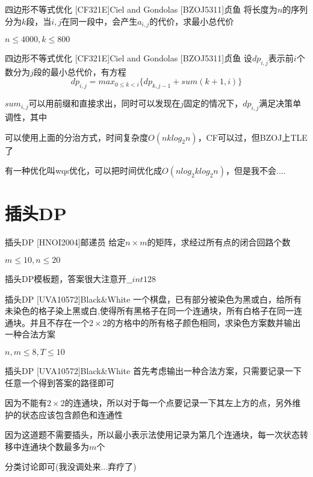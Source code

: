 \documentclass[9pt]{beamer}
\begin{document}
  \begin{frame}{四边形不等式优化 [CF321E]Ciel and Gondolas [BZOJ5311]贞鱼}
     将长度为$n$的序列分为$k$段，当$i,j$在同一段中，会产生$a_{i,j}$的代价，求最小总代价
    
     $n\leq 4000,k\leq 800$
  \end{frame}
    
  \begin{frame}{四边形不等式优化 [CF321E]Ciel and Gondolas [BZOJ5311]贞鱼}
     设$dp_{i,j}$表示前$i$个数分为$j$段的最小总代价，有方程
     $$dp_{i,j}=max_{0\leq k<i}\{dp_{k,j-1}+sum(k+1,i)\}$$
    
     $sum_{i,j}$可以用前缀和直接求出，同时可以发现在$j$固定的情况下，$dp_{i,j}$满足决策单调性，其中
    
     可以使用上面的分治方式，时间复杂度$O(nklog_2n)$，CF可以过，但BZOJ上TLE了

     有一种优化叫wqs优化，可以把时间优化成$O(nlog_2klog_2n)$，但是我不会....
  \end{frame}

  \section{插头DP}

  \begin{frame}{插头DP [HNOI2004]邮递员}
     给定$n\times m$的矩阵，求经过所有点的闭合回路个数

     $m\le 10,n\le 20$

     插头DP模板题，答案很大注意开$\_\_int128$
  \end{frame}
  
  \begin{frame}{插头DP [UVA10572]Black\&White}
     一个棋盘，已有部分被染色为黑或白，给所有未染色的格子染上黑或白,使得所有黑格子在同一个连通块，所有白格子在同一连通块。并且不存在一个$2\times 2$的方格中的所有格子颜色相同，求染色方案数并输出一种合法方案

     $n,m\le 8,T\le 10$
  \end{frame}

  \begin{frame}{插头DP [UVA10572]Black\&White}
     首先考虑输出一种合法方案，只需要记录一下任意一个得到答案的路径即可

     因为不能有$2\times 2$的连通块，所以对于每一个点要记录一下其左上方的点，另外维护的状态应该包含颜色和连通性

     因为这道题不需要插头，所以最小表示法使用记录为第几个连通块，每一次状态转移中连通块个数最多为$m$个

     分类讨论即可(我没调处来...弃疗了)
  \end{frame}
\end{document}
